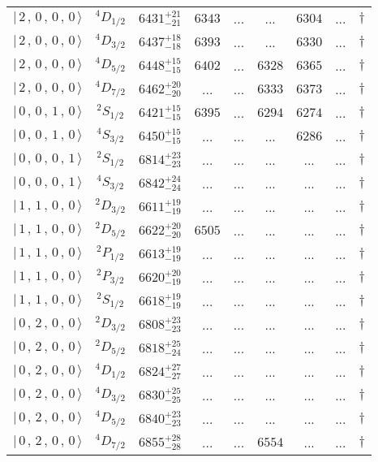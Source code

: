 \begin{tabular}{c c| c c c c c c c}
$\vert \,2\,,\,0\,,\,0\,,\,0 \,\rangle $ & $^{4}D_{1/2}$ & $6431^{+21}_{-21}$ & $6343$ & ... & ... & $6304$ & ... & $\dagger$ \\ 
$\vert \,2\,,\,0\,,\,0\,,\,0 \,\rangle $ & $^{4}D_{3/2}$ & $6437^{+18}_{-18}$ & $6393$ & ... & ... & $6330$ & ... & $\dagger$ \\ 
$\vert \,2\,,\,0\,,\,0\,,\,0 \,\rangle $ & $^{4}D_{5/2}$ & $6448^{+15}_{-15}$ & $6402$ & ... & $6328$ & $6365$ & ... & $\dagger$ \\ 
$\vert \,2\,,\,0\,,\,0\,,\,0 \,\rangle $ & $^{4}D_{7/2}$ & $6462^{+20}_{-20}$ & ... & ... & $6333$ & $6373$ & ... & $\dagger$ \\ 
$\vert \,0\,,\,0\,,\,1\,,\,0 \,\rangle $ & $^{2}S_{1/2}$ & $6421^{+15}_{-15}$ & $6395$ & ... & $6294$ & $6274$ & ... & $\dagger$ \\ 
$\vert \,0\,,\,0\,,\,1\,,\,0 \,\rangle $ & $^{4}S_{3/2}$ & $6450^{+15}_{-15}$ & ... & ... & ... & $6286$ & ... & $\dagger$ \\ 
$\vert \,0\,,\,0\,,\,0\,,\,1 \,\rangle $ & $^{2}S_{1/2}$ & $6814^{+23}_{-23}$ & ... & ... & ... & ... & ... & $\dagger$ \\ 
$\vert \,0\,,\,0\,,\,0\,,\,1 \,\rangle $ & $^{4}S_{3/2}$ & $6842^{+24}_{-24}$ & ... & ... & ... & ... & ... & $\dagger$ \\ 
$\vert \,1\,,\,1\,,\,0\,,\,0 \,\rangle $ & $^{2}D_{3/2}$ & $6611^{+19}_{-19}$ & ... & ... & ... & ... & ... & $\dagger$ \\ 
$\vert \,1\,,\,1\,,\,0\,,\,0 \,\rangle $ & $^{2}D_{5/2}$ & $6622^{+20}_{-20}$ & $6505$ & ... & ... & ... & ... & $\dagger$ \\ 
$\vert \,1\,,\,1\,,\,0\,,\,0 \,\rangle $ & $^{2}P_{1/2}$ & $6613^{+19}_{-19}$ & ... & ... & ... & ... & ... & $\dagger$ \\ 
$\vert \,1\,,\,1\,,\,0\,,\,0 \,\rangle $ & $^{2}P_{3/2}$ & $6620^{+20}_{-19}$ & ... & ... & ... & ... & ... & $\dagger$ \\ 
$\vert \,1\,,\,1\,,\,0\,,\,0 \,\rangle $ & $^{2}S_{1/2}$ & $6618^{+19}_{-19}$ & ... & ... & ... & ... & ... & $\dagger$ \\ 
$\vert \,0\,,\,2\,,\,0\,,\,0 \,\rangle $ & $^{2}D_{3/2}$ & $6808^{+23}_{-23}$ & ... & ... & ... & ... & ... & $\dagger$ \\ 
$\vert \,0\,,\,2\,,\,0\,,\,0 \,\rangle $ & $^{2}D_{5/2}$ & $6818^{+25}_{-24}$ & ... & ... & ... & ... & ... & $\dagger$ \\ 
$\vert \,0\,,\,2\,,\,0\,,\,0 \,\rangle $ & $^{4}D_{1/2}$ & $6824^{+27}_{-27}$ & ... & ... & ... & ... & ... & $\dagger$ \\ 
$\vert \,0\,,\,2\,,\,0\,,\,0 \,\rangle $ & $^{4}D_{3/2}$ & $6830^{+25}_{-25}$ & ... & ... & ... & ... & ... & $\dagger$ \\ 
$\vert \,0\,,\,2\,,\,0\,,\,0 \,\rangle $ & $^{4}D_{5/2}$ & $6840^{+23}_{-23}$ & ... & ... & ... & ... & ... & $\dagger$ \\ 
$\vert \,0\,,\,2\,,\,0\,,\,0 \,\rangle $ & $^{4}D_{7/2}$ & $6855^{+28}_{-28}$ & ... & ... & $6554$ & ... & ... & $\dagger$ \\ 
\hline \hline
\end{tabular}
